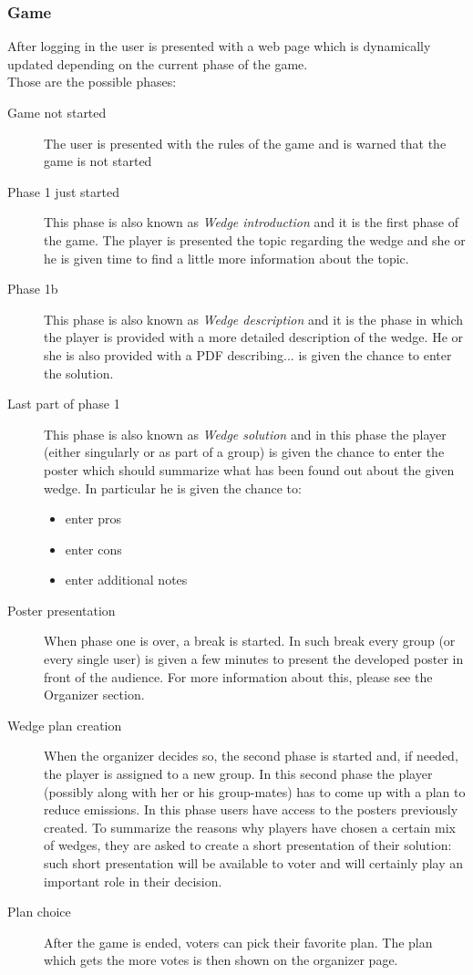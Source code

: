 \subsubsection{Game}
After logging in the user is presented with a web page which is dynamically updated depending on the current phase of the game.\\
Those are the possible phases:
\begin{description}
	\item[Game not started] The user is presented with the rules of the game and is warned that the game is not started
	\item[Phase 1 just started] This phase is also known as \emph{Wedge introduction} and it is the first phase of the game. The player is presented the topic regarding the wedge and she or he is given time to find a little more information about the topic.
	\item[Phase 1b] This phase is also known as \emph{Wedge description} and it is the phase in which the player is provided with a more detailed description of the wedge. He or she is also provided with a PDF describing... is given the chance to enter the solution.   %
	\item[Last part of phase 1] This phase is also known as \emph{Wedge solution} and in this phase the player (either singularly or as part of a group) is given the chance to enter the poster which should summarize what has been found out about the given wedge. In particular he is given the chance to:
	\begin{itemize}
\item enter pros
\item enter cons
\item enter additional notes
\end{itemize}

	\item[Poster presentation] When phase one is over, a break is started. In such break every group (or every single user) is given a few minutes to present the developed poster in front of the audience. For more information about this, please see the Organizer section.\\
	\item[Wedge plan creation] When the organizer decides so, the second phase is started and, if needed, the player is assigned to a new group. In this second phase the player (possibly along with her or his group-mates) has to come up with a plan to reduce emissions. In this phase users have access to the posters previously created. To summarize the reasons why players have chosen a certain mix of wedges, they are asked to create a short presentation of their solution: such short presentation will be available to voter and will certainly play an important role in their decision.
	\item[Plan choice] After the game is ended, voters can pick their favorite plan. The plan which gets the more votes is then shown on the organizer page.
\end{description}

